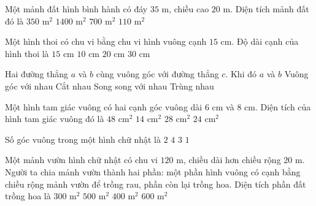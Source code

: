 \begin{ex} %
Một mảnh đất hình bình hành có đáy $35\text{ m}$, chiều cao $20\text{ m}$. Diện tích mảnh đất đó là
\choice
{$350\text{ m}^2$}
{$1400\text{ m}^2$}
{\True $700\text{ m}^2$}
{$110\text{ m}^2$}
\end{ex}

\begin{ex} %
Một hình thoi có chu vi bằng chu vi hình vuông cạnh $15\text{ cm}$. Độ dài cạnh của hình thoi là
\choice
{\True $15\text{ cm}$}
{$10\text{ cm}$}
{$20\text{ cm}$}
{$30\text{ cm}$}
\end{ex}

\begin{ex} %
Hai đường thẳng $a$ và $b$ cùng vuông góc với đường thẳng $c$. Khi đó $a$ và $b$
\choice
{Vuông góc với nhau}
{Cắt nhau}
{\True Song song với nhau}
{Trùng nhau}
\end{ex}

\begin{ex} %
Một hình tam giác vuông có hai cạnh góc vuông dài $6\text{ cm}$ và $8\text{ cm}$. Diện tích của hình tam giác vuông đó là
\choice
{$48\text{ cm}^2$}
{$14\text{ cm}^2$}
{$28\text{ cm}^2$}
{\True $24\text{ cm}^2$}
\end{ex}

\begin{ex} %
Số góc vuông trong một hình chữ nhật là
\choice
{$2$}
{\True $4$}
{$3$}
{$1$}
\end{ex}

\begin{ex} %
Một mảnh vườn hình chữ nhật có chu vi $120\text{ m}$, chiều dài hơn chiều rộng $20\text{ m}$. Người ta chia mảnh vườn thành hai phần: một phần hình vuông có cạnh bằng chiều rộng mảnh vườn để trồng rau, phần còn lại trồng hoa. Diện tích phần đất trồng hoa là
\choice
{$300\text{ m}^2$}
{$500\text{ m}^2$}
{\True $400\text{ m}^2$}
{$600\text{ m}^2$}
\end{ex}

